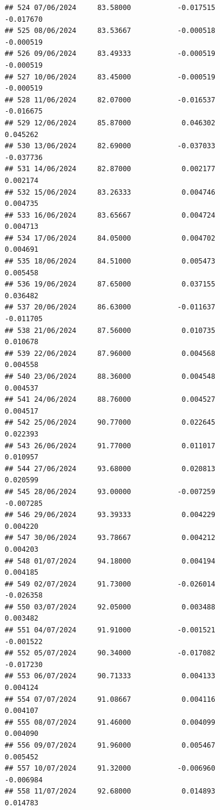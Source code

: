\documentclass[
]{article}
\begin{document}
\begin{verbatim}
## 524 07/06/2024     83.58000           -0.017515               -0.017670
## 525 08/06/2024     83.53667           -0.000518               -0.000519
## 526 09/06/2024     83.49333           -0.000519               -0.000519
## 527 10/06/2024     83.45000           -0.000519               -0.000519
## 528 11/06/2024     82.07000           -0.016537               -0.016675
## 529 12/06/2024     85.87000            0.046302                0.045262
## 530 13/06/2024     82.69000           -0.037033               -0.037736
## 531 14/06/2024     82.87000            0.002177                0.002174
## 532 15/06/2024     83.26333            0.004746                0.004735
## 533 16/06/2024     83.65667            0.004724                0.004713
## 534 17/06/2024     84.05000            0.004702                0.004691
## 535 18/06/2024     84.51000            0.005473                0.005458
## 536 19/06/2024     87.65000            0.037155                0.036482
## 537 20/06/2024     86.63000           -0.011637               -0.011705
## 538 21/06/2024     87.56000            0.010735                0.010678
## 539 22/06/2024     87.96000            0.004568                0.004558
## 540 23/06/2024     88.36000            0.004548                0.004537
## 541 24/06/2024     88.76000            0.004527                0.004517
## 542 25/06/2024     90.77000            0.022645                0.022393
## 543 26/06/2024     91.77000            0.011017                0.010957
## 544 27/06/2024     93.68000            0.020813                0.020599
## 545 28/06/2024     93.00000           -0.007259               -0.007285
## 546 29/06/2024     93.39333            0.004229                0.004220
## 547 30/06/2024     93.78667            0.004212                0.004203
## 548 01/07/2024     94.18000            0.004194                0.004185
## 549 02/07/2024     91.73000           -0.026014               -0.026358
## 550 03/07/2024     92.05000            0.003488                0.003482
## 551 04/07/2024     91.91000           -0.001521               -0.001522
## 552 05/07/2024     90.34000           -0.017082               -0.017230
## 553 06/07/2024     90.71333            0.004133                0.004124
## 554 07/07/2024     91.08667            0.004116                0.004107
## 555 08/07/2024     91.46000            0.004099                0.004090
## 556 09/07/2024     91.96000            0.005467                0.005452
## 557 10/07/2024     91.32000           -0.006960               -0.006984
## 558 11/07/2024     92.68000            0.014893                0.014783

\end{verbatim}
\end{document}
